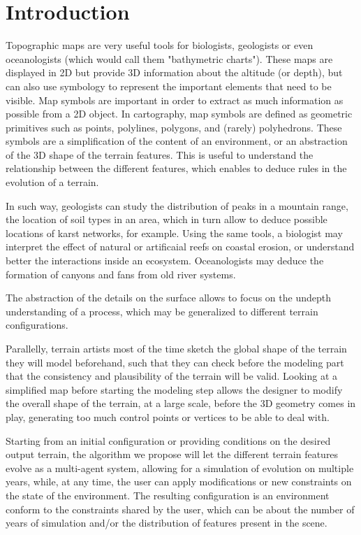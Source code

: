 \section{Introduction}
Topographic maps are very useful tools for biologists, geologists or even oceanologists (which would call them "bathymetric charts"). These maps are displayed in 2D but provide 3D information about the altitude (or depth), but can also use symbology to represent the important elements that need to be visible. Map symbols are important in order to extract as much information as possible from a 2D object. In cartography, map symbols are defined as geometric primitives such as points, polylines, polygons, and (rarely) polyhedrons. These symbols are a simplification of the content of an environment, or an abstraction of the 3D shape of the terrain features. This is useful to understand the relationship between the different features, which enables to deduce rules in the evolution of a terrain. 

In such way, geologists can study the distribution of peaks in a mountain range, the location of soil types in an area, which in turn allow to deduce possible locations of karst networks, for example. Using the same tools, a biologist may interpret the effect of natural or artificaial reefs on coastal erosion, or understand better the interactions inside an ecosystem. Oceanologists may deduce the formation of canyons and fans from old river systems.

The abstraction of the details on the surface allows to focus on the undepth understanding of a process, which may be generalized to different terrain configurations. 

Parallelly, terrain artists most of the time sketch the global shape of the terrain they will model beforehand, such that they can check before the modeling part that the consistency and plausibility of the terrain will be valid. Looking at a simplified map before starting the modeling step allows the designer to modify the overall shape of the terrain, at a large scale, before the 3D geometry comes in play, generating too much control points or vertices to be able to deal with.

Starting from an initial configuration or providing conditions on the desired output terrain, the algorithm we propose will let the different terrain features evolve as a multi-agent system, allowing for a simulation of evolution on multiple years, while, at any time, the user can apply modifications or new constraints on the state of the environment. The resulting configuration is an environment conform to the constraints shared by the user, which can be about the number of years of simulation and/or the distribution of features present in the scene.

